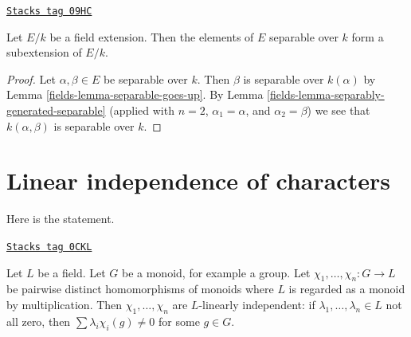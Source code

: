 \begin{lemma}
\label{fields-lemma-separable-elements}
\href{https://stacks.math.columbia.edu/tag/09HC}{\texttt{Stacks tag 09HC}}

Let $E/k$ be a field extension. Then the elements of $E$ separable
over $k$ form a subextension of $E/k$.
\end{lemma}

\begin{proof}

Let $\alpha, \beta \in E$ be separable over $k$. Then $\beta$ is separable
over $k(\alpha)$ by Lemma \ref{fields-lemma-separable-goes-up}.
By Lemma \ref{fields-lemma-separably-generated-separable} (applied with $n = 2$,
$\alpha_1 = \alpha$, and $\alpha_2 = \beta$) we see that
$k(\alpha, \beta)$ is separable over $k$.
\end{proof}

\section{Linear independence of characters}
\label{fields-section-independence-characters}
Here is the statement.

\begin{lemma}
\label{fields-lemma-independence-characters}
\href{https://stacks.math.columbia.edu/tag/0CKL}{\texttt{Stacks tag 0CKL}}

Let $L$ be a field. Let $G$ be a monoid, for example a group. Let
$\chi_1, \ldots, \chi_n : G \to L$ be pairwise distinct
homomorphisms of monoids where $L$ is regarded as a monoid
by multiplication. Then $\chi_1, \ldots, \chi_n$
are $L$-linearly independent: if $\lambda_1, \ldots, \lambda_n \in L$
not all zero, then $\sum \lambda_i\chi_i(g) \not = 0$
for some $g \in G$.
\end{lemma}

